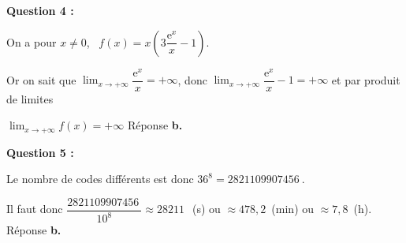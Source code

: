 \documentclass[10pt]{article}
\providecommand{\e}{{\mathrm{e}}}
\providecommand{\np}[2][]{{#2~#1}}
\begin{document}
\textbf{Question 4 :}









On a pour $x \ne 0$, \, $f(x) = x\left(3\dfrac{\e^x}{x}  - 1\right)$.

Or on sait que $\displaystyle\lim_{x \to + \infty} \dfrac{\text{e}^x}{x} = + \infty$, donc 
$\displaystyle\lim_{x \to + \infty} \dfrac{\text{e}^x}{x} - 1 = + \infty$ et par produit de limites
 
$\displaystyle\lim_{x \to + \infty} f(x) = + \infty$ Réponse \textbf{b.}
\medskip

\textbf{Question 5 :}














Le nombre de codes différents est donc $36^8 = \np{2821109907456}$.

Il faut donc $\dfrac{\np{2821109907456}}{10^8} \approx \np{28211}$~(s) ou $\approx 478,2$~(min) ou $\approx 7,8$~(h). Réponse \textbf{b.}

\bigskip
\end{document}
